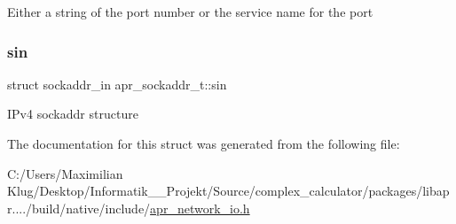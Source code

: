 Either a string of the port number or the service name for the port \mbox{\label{structapr__sockaddr__t_a7d5cf0290260c3c448360fc819b28714}} 
\subsubsection{\texorpdfstring{sin}{sin}}
{\footnotesize\ttfamily struct sockaddr\+\_\+in apr\+\_\+sockaddr\+\_\+t\+::sin}

I\+Pv4 sockaddr structure 

The documentation for this struct was generated from the following file\+:\begin{DoxyCompactItemize}
\item 
C\+:/\+Users/\+Maximilian Klug/\+Desktop/\+Informatik\+\_\+\_\+\+Projekt/\+Source/complex\+\_\+calculator/packages/libapr..../build/native/include/\mbox{\hyperlink{apr__network__io_8h}{apr\+\_\+network\+\_\+io.\+h}}\end{DoxyCompactItemize}

